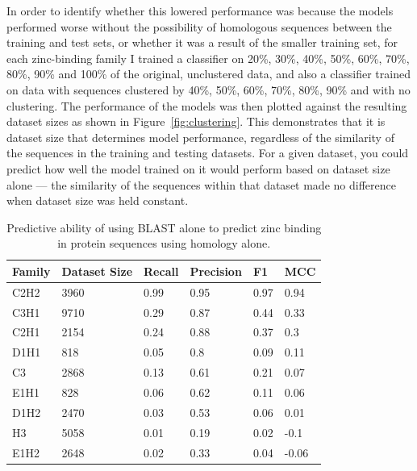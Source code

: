 In order to identify whether this lowered performance was because the models performed worse without the possibility of homologous sequences between the training and test sets, or whether it was a result of the smaller training set,
for each zinc-binding family I trained a classifier on 20\%, 30\%, 40\%, 50\%, 60\%, 70\%, 80\%, 90\% and 100\% of the
original, unclustered data, and also a classifier trained on data with sequences clustered by 40\%, 50\%, 60\%, 70\%, 80\%, 90\% and with no clustering. The performance of the models was then plotted against the resulting dataset sizes as shown in Figure~\ref{fig:clustering}.  This demonstrates that it is dataset size that determines model performance, regardless of the similarity of the sequences in the training and testing datasets. For a given dataset, you could predict how well the model trained on it would perform based on dataset size alone --- the similarity of the sequences within that dataset made no difference when dataset size was held constant.

\begin{table}
  \caption{\label{tab:psiblast}Predictive ability of using BLAST alone
    to predict zinc binding in protein sequences using homology
    alone.}
\begin{center}
\begin{tabular}{llllll} \hline
Family & Dataset Size & Recall & Precision & F1    &  MCC  \\ \hline
C2H2   & 3960         & 0.99   & 0.95      & 0.97  &  0.94 \\
C3H1   & 9710         & 0.29   & 0.87      & 0.44  &  0.33 \\
C2H1   & 2154         & 0.24   & 0.88      & 0.37  &  0.3  \\
D1H1   & 818          & 0.05   & 0.8       & 0.09  &  0.11 \\
C3     & 2868         & 0.13   & 0.61      & 0.21  &  0.07 \\ 
E1H1   & 828          & 0.06   & 0.62      & 0.11  &  0.06 \\
D1H2   & 2470         & 0.03   & 0.53      & 0.06  &  0.01 \\
H3     & 5058         & 0.01   & 0.19      & 0.02  & -0.1  \\
E1H2   & 2648         & 0.02   & 0.33      & 0.04  & -0.06 \\ \hline
\end{tabular}
\end{center}
\end{table}

